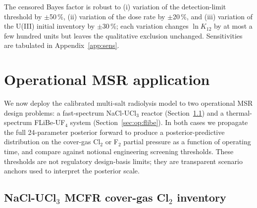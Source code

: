 \documentclass[11pt]{article}
\theoremstyle{plain}
\theoremstyle{definition}
\theoremstyle{remark}
\begin{document}
The censored Bayes factor is robust to (i) variation of the
detection-limit threshold by $\pm$50\,\%, (ii) variation of the dose rate
by $\pm$20\,\%, and (iii) variation of the U(III) initial inventory by
$\pm$30\,\%; each variation changes $\ln K_{12}$ by at most a few hundred
units but leaves the qualitative exclusion unchanged.  Sensitivities are
tabulated in Appendix~\ref{app:sens}.

\section{Operational MSR application}\label{sec:operational}

We now deploy the calibrated multi-salt radiolysis model to two operational
MSR design problems: a fast-spectrum NaCl-UCl$_3$ reactor
(Section~\ref{sec:op:mcfr}) and a thermal-spectrum FLiBe-UF$_4$ system
(Section~\ref{sec:op:flibe}).  In both cases we propagate the full
24-parameter posterior forward to produce a posterior-predictive
distribution on the cover-gas Cl$_2$ or F$_2$ partial pressure as a function
of operating time, and compare against notional engineering screening
thresholds.  These thresholds are not regulatory design-basis limits; they
are transparent scenario anchors used to interpret the posterior scale.

\subsection{NaCl-UCl$_3$ MCFR cover-gas Cl$_2$ inventory}\label{sec:op:mcfr}
\end{document}
